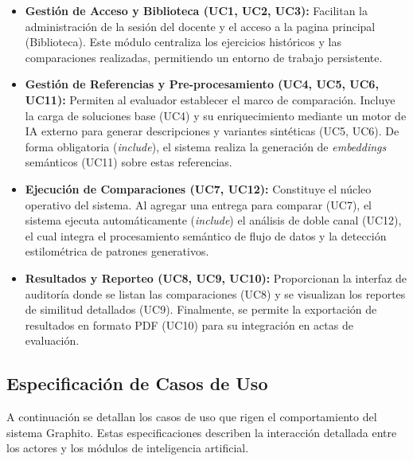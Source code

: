 \begin{itemize}
	\item \textbf{Gestión de Acceso y Biblioteca (UC1, UC2, UC3):} Facilitan la administración de la sesión del docente y el acceso a la pagina principal (Biblioteca). Este módulo centraliza los ejercicios históricos y las comparaciones realizadas, permitiendo un entorno de trabajo persistente.
	\item \textbf{Gestión de Referencias y Pre-procesamiento (UC4, UC5, UC6, UC11):} Permiten al evaluador establecer el marco de comparación. Incluye la carga de soluciones base (UC4) y su enriquecimiento mediante un motor de IA externo para generar descripciones y variantes sintéticas (UC5, UC6). De forma obligatoria (\textit{include}), el sistema realiza la generación de \textit{embeddings} semánticos (UC11) sobre estas referencias.
	\item \textbf{Ejecución de Comparaciones (UC7, UC12):} Constituye el núcleo operativo del sistema. Al agregar una entrega para comparar (UC7), el sistema ejecuta automáticamente (\textit{include}) el análisis de doble canal (UC12), el cual integra el procesamiento semántico de flujo de datos y la detección estilométrica de patrones generativos.
	\item \textbf{Resultados y Reporteo (UC8, UC9, UC10):} Proporcionan la interfaz de auditoría donde se listan las comparaciones (UC8) y se visualizan los reportes de similitud detallados (UC9). Finalmente, se permite la exportación de resultados en formato PDF (UC10) para su integración en actas de evaluación.
\end{itemize}

\subsection{Especificación de Casos de Uso}

A continuación se detallan los casos de uso que rigen el comportamiento del sistema Graphito. Estas especificaciones describen la interacción detallada entre los actores y los módulos de inteligencia artificial.


